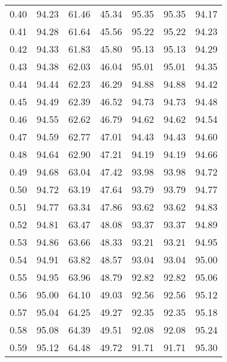\begin{tabular}{|c|c|c|c|c|c|c|}
      0.40 &     94.23 &     61.46 &      45.34 &   95.35 &      95.35 &         94.17 \\
      0.41 &     94.28 &     61.64 &      45.56 &   95.22 &      95.22 &         94.23 \\
      0.42 &     94.33 &     61.83 &      45.80 &   95.13 &      95.13 &         94.29 \\
      0.43 &     94.38 &     62.03 &      46.04 &   95.01 &      95.01 &         94.35 \\
      0.44 &     94.44 &     62.23 &      46.29 &   94.88 &      94.88 &         94.42 \\
      0.45 &     94.49 &     62.39 &      46.52 &   94.73 &      94.73 &         94.48 \\
      0.46 &     94.55 &     62.62 &      46.79 &   94.62 &      94.62 &         94.54 \\
      0.47 &     94.59 &     62.77 &      47.01 &   94.43 &      94.43 &         94.60 \\
      0.48 &     94.64 &     62.90 &      47.21 &   94.19 &      94.19 &         94.66 \\
      0.49 &     94.68 &     63.04 &      47.42 &   93.98 &      93.98 &         94.72 \\
      0.50 &     94.72 &     63.19 &      47.64 &   93.79 &      93.79 &         94.77 \\
      0.51 &     94.77 &     63.34 &      47.86 &   93.62 &      93.62 &         94.83 \\
      0.52 &     94.81 &     63.47 &      48.08 &   93.37 &      93.37 &         94.89 \\
      0.53 &     94.86 &     63.66 &      48.33 &   93.21 &      93.21 &         94.95 \\
      0.54 &     94.91 &     63.82 &      48.57 &   93.04 &      93.04 &         95.00 \\
      0.55 &     94.95 &     63.96 &      48.79 &   92.82 &      92.82 &         95.06 \\
      0.56 &     95.00 &     64.10 &      49.03 &   92.56 &      92.56 &         95.12 \\
      0.57 &     95.04 &     64.25 &      49.27 &   92.35 &      92.35 &         95.18 \\
      0.58 &     95.08 &     64.39 &      49.51 &   92.08 &      92.08 &         95.24 \\
      0.59 &     95.12 &     64.48 &      49.72 &   91.71 &      91.71 &         95.30 \\

\end{tabular}
